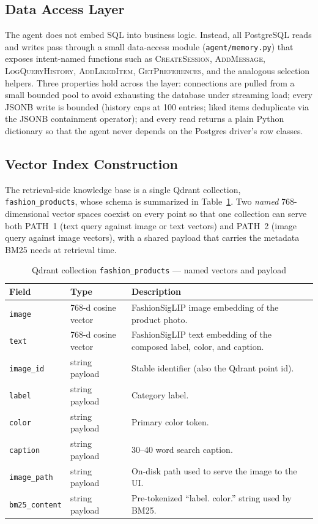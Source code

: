 \subsection{Data Access Layer}

The agent does not embed SQL into business logic. Instead, all PostgreSQL reads and writes pass through a small data-access module (\texttt{agent/memory.py}) that exposes intent-named functions such as \textsc{CreateSession}, \textsc{AddMessage}, \textsc{LogQueryHistory}, \textsc{AddLikedItem}, \textsc{GetPreferences}, and the analogous selection helpers. Three properties hold across the layer: connections are pulled from a small bounded pool to avoid exhausting the database under streaming load; every JSONB write is bounded (history caps at 100 entries; liked items deduplicate via the JSONB containment operator); and every read returns a plain Python dictionary so that the agent never depends on the Postgres driver's row classes.

\subsection{Vector Index Construction}
\label{subsec:vector_index}

The retrieval-side knowledge base is a single Qdrant collection, \texttt{fashion\_products}, whose schema is summarized in Table~\ref{tab:qdrant_schema}. Two \emph{named} 768-dimensional vector spaces coexist on every point so that one collection can serve both PATH~1 (text query against image or text vectors) and PATH~2 (image query against image vectors), with a shared payload that carries the metadata BM25 needs at retrieval time.

\begin{table}[H]
\centering
\begin{tabular}{p{3.2cm}p{3.2cm}p{7.4cm}}
\toprule
\textbf{Field} & \textbf{Type} & \textbf{Description}\\
\midrule
\texttt{image}      & 768-d cosine vector & FashionSigLIP image embedding of the product photo.\\
\texttt{text}       & 768-d cosine vector & FashionSigLIP text embedding of the composed label, color, and caption.\\
\texttt{image\_id}  & string payload      & Stable identifier (also the Qdrant point id).\\
\texttt{label}      & string payload      & Category label.\\
\texttt{color}      & string payload      & Primary color token.\\
\texttt{caption}    & string payload      & 30--40 word search caption.\\
\texttt{image\_path}& string payload      & On-disk path used to serve the image to the UI.\\
\texttt{bm25\_content} & string payload   & Pre-tokenized ``label. color.'' string used by BM25.\\
\bottomrule
\end{tabular}
\caption{Qdrant collection \texttt{fashion\_products} --- named vectors and payload}
\label{tab:qdrant_schema}
\end{table}

